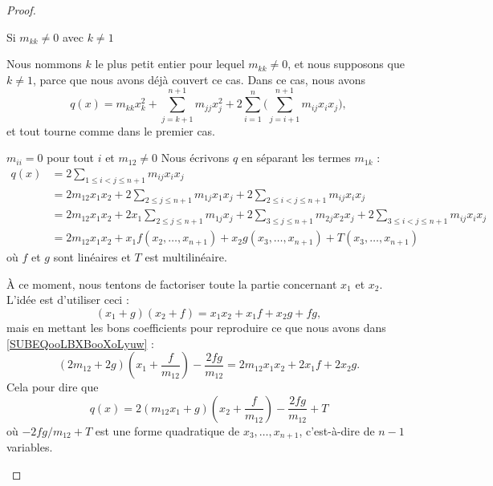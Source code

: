 \begin{proof}
\begin{subproof}
        \item[Si \( m_{kk}\neq 0\) avec \( k\neq 1\)]

            Nous nommons \( k\) le plus petit entier pour lequel \( m_{kk}\neq 0\), et nous supposons que \( k\neq 1\), parce que nous avons déjà couvert ce cas. Dans ce cas, nous avons
            \begin{equation}
                q(x)=m_{kk}x_k^2+\sum_{j=k+1}^{n+1}m_{jj}x_j^2  +2\sum_{i=1}^n\big( \sum_{j=i+1}^{n+1}m_{ij}x_ix_j \big),
            \end{equation}
            et tout tourne comme dans le premier cas.
        \item[\( m_{ii}=0\) pour tout \( i\) et \( m_{12}\neq 0\)]
            Nous écrivons \( q\) en séparant les termes \( m_{1k}\) :
            \begin{subequations}
                \begin{align}
                    q(x)&=2\sum_{1\leq i<j\leq n+1}m_{ij}x_ix_j\\
                    &=2m_{12}x_1x_2+2\sum_{2\leq j\leq n+1}m_{1j}x_1x_j+2\sum_{2\leq i<j\leq n+1}m_{ij}x_ix_j\\
                    &=2m_{12}x_1x_2+2x_1\sum_{2\leq j\leq n+1}m_{1j}x_j+2\sum_{3\leq j\leq n+1}m_{2j}x_2x_j+2\sum_{3\leq i<j\leq n+1}m_{ij}x_ix_j\\
                    &=2m_{12}x_1x_2+x_1f(x_2,\ldots, x_{n+1})+x_2g(x_3,\ldots, x_{n+1})+T(x_3,\ldots, x_{n+1})      \label{SUBEQooLBXBooXoLyuw}
                \end{align}
            \end{subequations}
            où \( f\) et \( g\) sont linéaires et \( T\) est multilinéaire.

            À ce moment, nous tentons de factoriser toute la partie concernant \( x_1\) et \( x_2\). L'idée est d'utiliser ceci :
            \begin{equation}
                (x_1+g)(x_2+f)=x_1x_2+x_1f+x_2g+fg,
            \end{equation}
            mais en mettant les bons coefficients pour reproduire ce que nous avons dans \eqref{SUBEQooLBXBooXoLyuw} : 
            \begin{equation}
                (2m_{12}+2g)(x_1+\frac{ f }{ m_{12} })-\frac{ 2fg }{ m_{12} }=2m_{12}x_1x_2+2x_1f+2x_2g.
            \end{equation}
            Cela pour dire que
            \begin{equation}
                q(x)=2(m_{12}x_1+g)(x_2+\frac{ f }{ m_{12} })-\frac{ 2fg }{ m_{12} }+T
            \end{equation}
            où \(-2fg/m_{12}+T\) est une forme quadratique de \( x_3,\ldots, x_{n+1}\), c'est-à-dire de \( n-1\) variables.


\end{subproof}
\end{proof}
